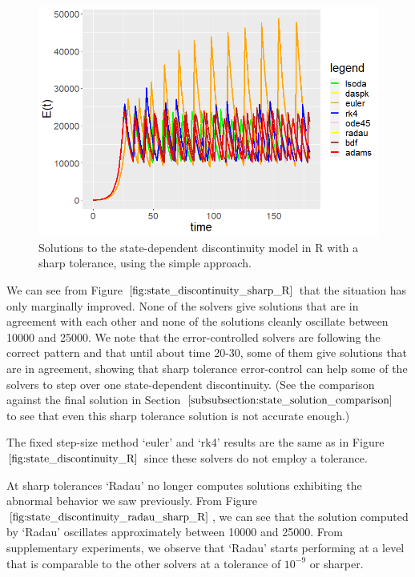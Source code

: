\begin{figure}[H]
\centering
\includegraphics[width=0.7\linewidth]{./figures/state_discontinuity_sharp_R}
\caption{Solutions to the state-dependent discontinuity model in R with a sharp tolerance, using the simple approach.}
\label{fig:state_discontinuity_sharp_R}
\end{figure}

We can see from Figure $\ref{fig:state_discontinuity_sharp_R}$ that the situation has only marginally improved. None of the solvers give solutions that are in agreement with each other and none of the solutions cleanly oscillate between 10000 and 25000. We note that the error-controlled solvers are following the correct pattern and that until about time 20-30, some of them give solutions that are in agreement, showing that sharp tolerance error-control can help some of the solvers to step over one state-dependent discontinuity. (See the comparison against the final solution in Section $\ref{subsubsection:state_solution_comparison}$ to see that even this sharp tolerance solution is not accurate enough.)

The fixed step-size method `euler' and `rk4' results are the same as in Figure $\ref{fig:state_discontinuity_R}$ since these solvers do not employ a tolerance.

At sharp tolerances `Radau' no longer computes solutions exhibiting the abnormal behavior we saw previously. From Figure $\ref{fig:state_discontinuity_radau_sharp_R}$, we can see that the solution computed by `Radau' oscillates approximately between 10000 and 25000. From supplementary experiments, we observe that `Radau' starts performing at a level that is comparable to the other solvers at a tolerance of $10^{-9}$ or sharper.

